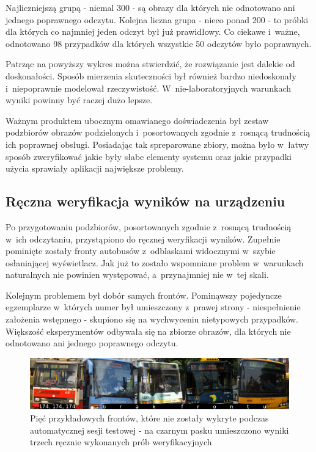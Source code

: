 Najliczniejszą grupą - niemal 300 - 
są obrazy dla których nie odnotowano ani jednego poprawnego odczytu.
Kolejna liczna grupa - nieco ponad 200 - to próbki dla których
co najmniej jeden odczyt był już prawidłowy. Co ciekawe i~ważne, odnotowano 98
przypadków dla których wszystkie 50 odczytów było poprawnych.

Patrząc na powyższy wykres można stwierdzić, że rozwiązanie jest 
dalekie od doskonałości. Sposób mierzenia skuteczności 
był również bardzo niedoskonały i~niepoprawnie modelował rzeczywistość.
W~nie-laboratoryjnych warunkach wyniki powinny być raczej dużo lepsze.

Ważnym produktem ubocznym omawianego doświadczenia był zestaw podzbiorów obrazów
podzielonych i~posortowanych zgodnie z~rosnącą trudnością ich poprawnej obsługi.
Posiadając tak spreparowane zbiory, można było w~łatwy sposób zweryfikować
jakie były słabe elementy systemu oraz jakie przypadki użycia
sprawiały aplikacji największe problemy.

\subsection{Ręczna weryfikacja wyników na urządzeniu}

Po przygotowaniu podzbiorów, posortowanych zgodnie z~rosnącą
trudnością w~ich odczytaniu, przystąpiono do ręcznej weryfikacji wyników.
Zupełnie pominięte zostały fronty autobusów z~odblaskami widocznymi
w~szybie osłaniającej wyświetlacz. Jak już to zostało 
wspomniane problem w~warunkach naturalnych nie powinien występować,
a~przynajmniej nie w~tej skali.

Kolejnym problemem był dobór samych frontów. Pominąwszy
pojedyncze egzemplarze w~których numer był umieszczony z~prawej
strony - niespełnienie założenia wstępnego - skupiono się na wychwyceniu nietypowych
przypadków. Większość eksperymentów odbywała się na zbiorze obrazów,
dla których nie odnotowano ani jednego poprawnego odczytu.

\begin{figure}[h!]
	\centering
	\includegraphics[width=1\textwidth]{img/final/front}
	\caption{Pięć przykładowych frontów, które nie zostały wykryte
		podczas automatycznej sesji testowej - na czarnym 
		pasku umieszczono wyniki trzech ręcznie wykonanych prób
		weryfikacyjnych}
	\label{fig:final_front}
\end{figure}

